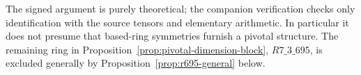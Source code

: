 The signed argument is purely theoretical; the companion verification
checks only identification with the source tensors and elementary
arithmetic. In particular it does not presume that based-ring
symmetries furnish a pivotal structure. The remaining ring in
Proposition~\ref{prop:pivotal-dimension-block}, $R7\_3\_695$, is
excluded generally by Proposition~\ref{prop:r695-general} below.
